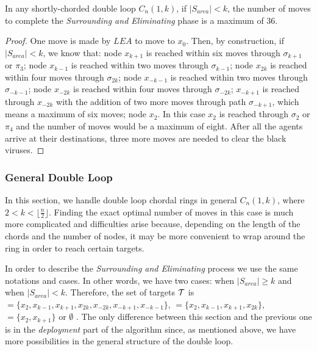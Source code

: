 \begin{theorem} 
In any shortly-chorded  double loop   $C_n(1,k)$, if $\left\vert{S_{area}}\right\vert < k$,
the number of moves to complete the  {\em Surrounding  and Eliminating} phase is a maximum of $36$.
\end{theorem}

 \begin{proof}
One move is made by $LEA$ to move to $x_0$. Then, by construction,  if  $\left\vert{S_{area}}\right\vert < k$, we know that: node  $x_{k+1}$ is reached within six moves through $\sigma_{k+1}$ or $\pi_3$; 
node  $x_{k-1}$ is reached within two moves through $\sigma_{k-1}$;
node  $x_{2k}$ is reached within four moves through $\sigma_{2k}$;
node   $x_{-k-1}$ is reached within two moves through $\sigma_{-k-1}$;
node    $x_{-2k}$ is reached within four moves through $\sigma_{-2k}$;
  $x_{-k+1}$ is  reached through $x_{-2k}$ with the addition of two more moves through path $\sigma_{-k+1}$, which means a maximum of six moves;
node $x_{2}$. In this case $x_2$ is reached through $\sigma_{2}$ or $\pi_4$ and the number of moves would be a maximum of eight. After all the agents arrive at their destinations, three more moves are needed to clear the black viruses. 

\end{proof}


\subsubsection{General Double Loop}
\label{sec:general}


In this section, we handle double loop chordal rings in general $C_n(1,k)$, where  $2 < k  < \lfloor\frac{n}{2}\rfloor$. 
Finding the exact optimal number of moves in this  case is much more complicated and difficulties arise because, depending on the length of the chords and the number of nodes,  it may be more convenient to wrap around the ring in order to reach certain targets.

In order to describe the {\em Surrounding and Eliminating} process we use the same notations and cases. In other words, we have two cases: when $\left\vert{S_{area}}\right\vert \ge k$ and when $\left\vert{S_{area}}\right\vert < k$. Therefore, the set of targets ${\cal T}$ is  $=\{x_{2},x_{k-1},x_{k+1},x_{2k},x_{-2k},x_{-k+1},x_{-k-1}\}$,  $=\{x_{2},x_{k-1},x_{k+1},x_{2k}\}$, $=\{x_{2},x_{k+1}\}$ or $\emptyset$ . The only difference between this section and the previous one is in the {\it deployment} part of the algorithm since, as mentioned above, we have more possibilities in the general structure of the double loop. 


